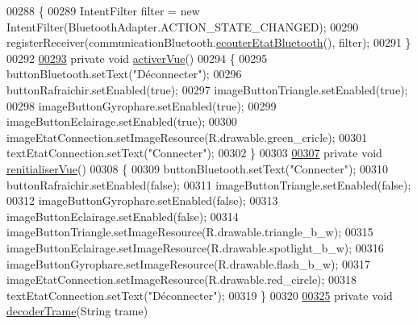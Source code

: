 \begin{DoxyCode}
00288     \{
00289         IntentFilter filter = \textcolor{keyword}{new} IntentFilter(BluetoothAdapter.ACTION\_STATE\_CHANGED);
00290         registerReceiver(communicationBluetooth.\hyperlink{classcom_1_1lasalle_1_1io__trucks_1_1_communication_aee896ab782ae245bdb1177d3d80ba193}{ecouterEtatBluetooth}(), filter);
00291     \}
00292 
\hyperlink{classcom_1_1lasalle_1_1io__trucks_1_1_main_activity_a09f9deded45d212d479d2206ddf52749}{00293}     \textcolor{keyword}{private} \textcolor{keywordtype}{void} \hyperlink{classcom_1_1lasalle_1_1io__trucks_1_1_main_activity_a09f9deded45d212d479d2206ddf52749}{activerVue}()
00294     \{
00295         buttonBluetooth.setText(\textcolor{stringliteral}{"Déconnecter"});
00296         buttonRafraichir.setEnabled(\textcolor{keyword}{true});
00297         imageButtonTriangle.setEnabled(\textcolor{keyword}{true});
00298         imageButtonGyrophare.setEnabled(\textcolor{keyword}{true});
00299         imageButtonEclairage.setEnabled(\textcolor{keyword}{true});
00300         imageEtatConnection.setImageResource(R.drawable.green\_cricle);
00301         textEtatConnection.setText(\textcolor{stringliteral}{"Connecter"});
00302     \}
00303 
\hyperlink{classcom_1_1lasalle_1_1io__trucks_1_1_main_activity_ac4c0bdaf761a42e924c6cf9d1b9a0e23}{00307}     \textcolor{keyword}{private} \textcolor{keywordtype}{void} \hyperlink{classcom_1_1lasalle_1_1io__trucks_1_1_main_activity_ac4c0bdaf761a42e924c6cf9d1b9a0e23}{renitialiserVue}()
00308     \{
00309         buttonBluetooth.setText(\textcolor{stringliteral}{"Connecter"});
00310         buttonRafraichir.setEnabled(\textcolor{keyword}{false});
00311         imageButtonTriangle.setEnabled(\textcolor{keyword}{false});
00312         imageButtonGyrophare.setEnabled(\textcolor{keyword}{false});
00313         imageButtonEclairage.setEnabled(\textcolor{keyword}{false});
00314         imageButtonTriangle.setImageResource(R.drawable.triangle\_b\_w);
00315         imageButtonEclairage.setImageResource(R.drawable.spotlight\_b\_w);
00316         imageButtonGyrophare.setImageResource(R.drawable.flash\_b\_w);
00317         imageEtatConnection.setImageResource(R.drawable.red\_circle);
00318         textEtatConnection.setText(\textcolor{stringliteral}{"Déconnecter"});
00319     \}
00320 
\hyperlink{classcom_1_1lasalle_1_1io__trucks_1_1_main_activity_afee6fb53a4414e7b577ea329fd473ba4}{00325}     \textcolor{keyword}{private} \textcolor{keywordtype}{void} \hyperlink{classcom_1_1lasalle_1_1io__trucks_1_1_main_activity_afee6fb53a4414e7b577ea329fd473ba4}{decoderTrame}(String trame)

\end{DoxyCode}
